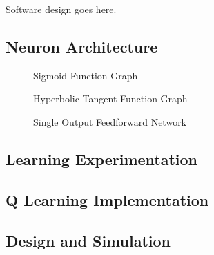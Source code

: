 Software design goes here.

\subsection{Neuron Architecture}

\begin{figure}
	\centering
	
	\caption{Sigmoid Function Graph}
\end{figure}

\begin{figure} [h]
	\centering
	
	\caption{Hyperbolic Tangent Function Graph}
\end{figure}

\begin{figure} [h]
	\centering
	
	\caption{Single Output Feedforward Network}
\end{figure}

\subsection{Learning Experimentation}


\subsection{Q Learning Implementation}

\subsection{Design and Simulation}
